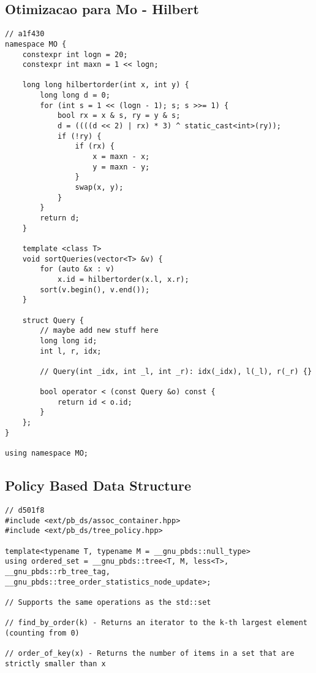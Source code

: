 \documentclass[12pt, a4paper, twoside]{article}
\begin{document}
\subsection{Otimizacao para Mo - Hilbert
}
\begin{lstlisting}
// a1f430
namespace MO {
	constexpr int logn = 20;
	constexpr int maxn = 1 << logn;

	long long hilbertorder(int x, int y) {
		long long d = 0;
		for (int s = 1 << (logn - 1); s; s >>= 1) {
			bool rx = x & s, ry = y & s;
			d = ((((d << 2) | rx) * 3) ^ static_cast<int>(ry));
			if (!ry) {
				if (rx) {
					x = maxn - x;
					y = maxn - y;
				}
				swap(x, y);
			}
		}
		return d;
	}

	template <class T>
	void sortQueries(vector<T> &v) {
		for (auto &x : v)
			x.id = hilbertorder(x.l, x.r);
		sort(v.begin(), v.end());
	}

	struct Query {
		// maybe add new stuff here
		long long id;
		int l, r, idx;

		// Query(int _idx, int _l, int _r): idx(_idx), l(_l), r(_r) {}

		bool operator < (const Query &o) const {
			return id < o.id;
		}
	};
}

using namespace MO;
\end{lstlisting}

\subsection{Policy Based Data Structure
}
\begin{lstlisting}
// d501f8
#include <ext/pb_ds/assoc_container.hpp>
#include <ext/pb_ds/tree_policy.hpp>

template<typename T, typename M = __gnu_pbds::null_type>
using ordered_set = __gnu_pbds::tree<T, M, less<T>, __gnu_pbds::rb_tree_tag, __gnu_pbds::tree_order_statistics_node_update>;

// Supports the same operations as the std::set

// find_by_order(k) - Returns an iterator to the k-th largest element (counting from 0)

// order_of_key(x) - Returns the number of items in a set that are strictly smaller than x
\end{lstlisting}
\end{document}
